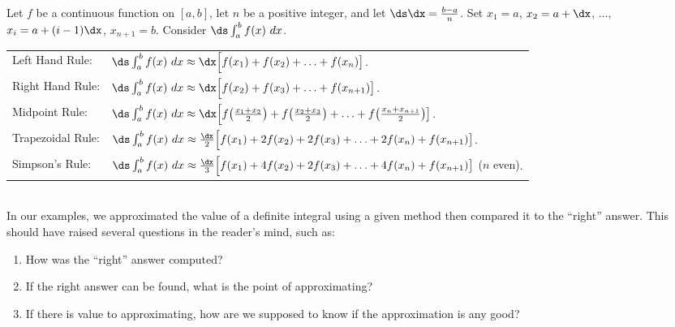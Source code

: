 \setboxwidth{120pt}%
%
\noindent\begin{minipage}{\specialboxlength}
{Let $f$ be a continuous function on $[a,b]$, let $n$ be a positive integer, and let $\ds\dx = \frac{b-a}{n}$.
Set $x_1=a$, $x_2 = a+\dx$, $\ldots$, $x_i = a+(i-1)\dx$, $x_{n+1}=b$.
Consider $\ds\int_a^b f(x)\ dx$.\\
\begin{tabular}{ll}
Left Hand Rule: &
$\ds\int_a^b f(x)\ dx \approx \dx\Big[f(x_1) + f(x_2) + \ldots + f(x_n)\big]$.\\
Right Hand Rule: &
$\ds\int_a^b f(x)\ dx \approx \dx\Big[f(x_2) + f(x_3) + \ldots + f(x_{n+1})\big]$.\\
Midpoint Rule: &
$\ds\int_a^b f(x)\ dx \approx \dx\Big[f\big(\frac{x_1+x_2}2\big) + f\big(\frac{x_2+x_3}2\big) + \ldots + f\big(\frac{x_n+x_{n+1}}2\big)\big]$.\\
Trapezoidal Rule: &
$\ds\int_a^b f(x)\ dx \approx \frac{\dx}2\Big[f(x_1) + 2f(x_2) + 2f(x_3) +\ldots + 2f(x_n)+ f(x_{n+1})\big]$.\\
Simpson's Rule: &
$\ds\int_a^b f(x)\ dx \approx \frac{\dx}3\Big[f(x_1) + 4f(x_2) + 2f(x_3) +\ldots + 4f(x_n)+ f(x_{n+1})\big]$ {\small ($n$ even)}.
\end{tabular}
}
\end{minipage}
\restoreboxwidth\\

In our examples, we approximated the value of a definite integral using a given method then compared it to the ``right'' answer. This should have raised several questions in the reader's mind, such as:
\begin{enumerate}
\item		How was the ``right'' answer computed?
\item		If the right answer can be found, what is the point of approximating?
\item		If there is value to approximating, how are we supposed to know if the approximation is any good?
\end{enumerate}

